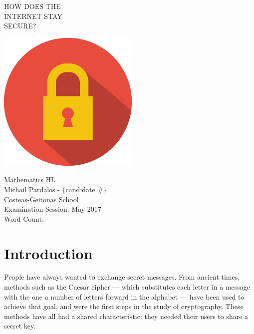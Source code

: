 \documentclass[12pt, titlepage]{article}
\begin{document}
\begin{titlepage}
    \vspace*{\fill}
	\centering

    {\titlefont HOW DOES THE}\\[0.5cm]
    {\titlefont INTERNET STAY}\\[0.5cm]
    {\titlefont SECURE?}

    \vspace{2.5cm}
    \includegraphics[scale=0.8]{title_image}
    \vspace{2.5cm}

    {\Large Mathematics HL} \\
    \vspace{0.5cm}
    {\Large Michail Pardalos - \{candidate \#\} }\\
    \vspace{0.5cm}
    {\Large Costeas-Geitonas School} \\
    \vspace{0.5cm}
    {\Large Examination Session: May 2017} \\
    \vspace{0.5cm}
    {\Large Word Count: }
    \vspace*{\fill}
\end{titlepage}

\tableofcontents
\newpage

\setcounter{page}{1}
\section*{Introduction}
\label{sec:intro}

    People have always wanted to exchange secret messages. From ancient times, methods such
    as the Caesar cipher --- which substitutes each letter in a message with the one a
    number of letters forward in the alphabet --- have been used to achieve that goal, and
    were the first steps in the study of cryptography. These methods have all had a shared
    characteristic: they needed their users to share a secret key.
\end{document}
